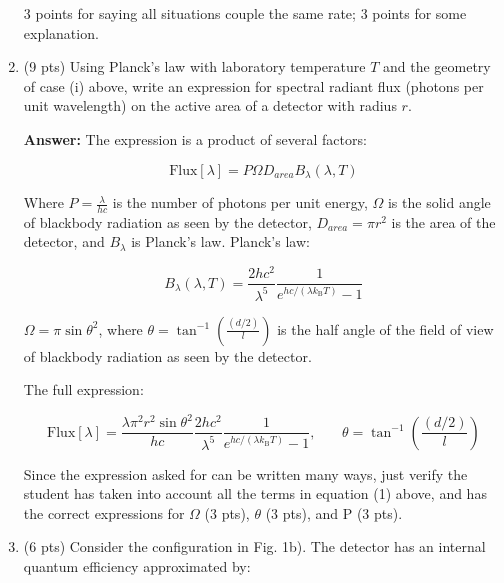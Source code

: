 \documentclass[11pt]{caltech_thesis} %
\begin{document}
\begin{enumerate}
  {\color{darkred}  3 points for saying all situations couple the same
  rate; 3 points for some explanation. }
\item
  (9 pts) Using Planck's law with laboratory temperature \(T\) and the
  geometry of case (i) above, write an expression for spectral radiant
  flux (photons per unit wavelength) on the active area of a detector
  with radius \(r\).

  {\color{midnightblue}  \textbf{Answer:} } {\color{midnightblue} The
  expression is a product of several factors:}

  {\color{midnightblue} 

  \[\text{Flux}[\lambda] = P \Omega D_{area} B_{\lambda}(\lambda, T)\]

  }

  {\color{midnightblue}  Where \(P = \frac{\lambda}{hc}\) is the number
  of photons per unit energy, \(\Omega\) is the solid angle of blackbody
  radiation as seen by the detector, \(D_{area} = \pi r^2\) is the area
  of the detector, and \(B_{\lambda}\) is Planck's law. }
  {\color{midnightblue} Planck's law:}

  {\color{midnightblue} 

  \[B_{\lambda}(\lambda, T)=\frac{2 h c^{2}}{\lambda^{5}} \frac{1}{e^{h c /\left(\lambda k_{\mathrm{B}} T\right)}-1}\]

  }

  {\color{midnightblue}  \(\Omega = \pi \sin{\theta^2}\), where
  \(\theta = \tan^{-1}(\frac{(d/2)}{l})\) is the half angle of the field
  of view of blackbody radiation as seen by the detector. }

  {\color{midnightblue} The full expression: }

  {\color{midnightblue} 

  \[\text{Flux}[\lambda] = \frac{\lambda \pi^2 r^2 \sin{\theta^2}}{hc} \frac{2 h c^{2}}{\lambda^{5}} \frac{1}{e^{h c /\left(\lambda k_{\mathrm{B}} T\right)}-1}, \,\,\,\,\,\,\,\,\,\,\,\theta = \tan^{-1}(\frac{(d/2)}{l})\]

  }

  {\color{midnightblue}  Since the expression asked for can be written
  many ways, just verify the student has taken into account all the
  terms in equation (1) above, and has the correct expressions for}
  {\color{darkred} \(\Omega\) (3 pts), \(\theta\) (3 pts), and P (3
  pts).}
\item
  (6 pts) Consider the configuration in Fig. 1b). The detector has an
  internal quantum efficiency approximated by:


\end{enumerate}
\end{document}
